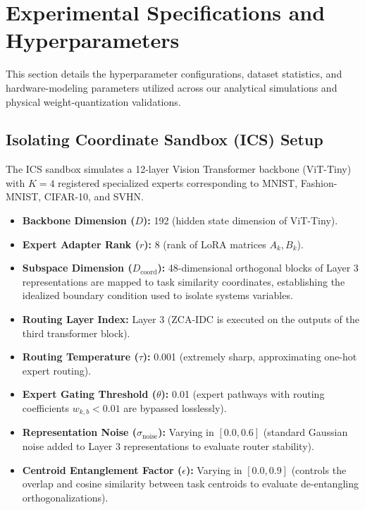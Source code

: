 \section{Experimental Specifications and Hyperparameters}
\label{sec:appendix_params}

This section details the hyperparameter configurations, dataset statistics, and hardware-modeling parameters utilized across our analytical simulations and physical weight-quantization validations.

\subsection{Isolating Coordinate Sandbox (ICS) Setup}
\label{sec:appendix_ics_params}

The ICS sandbox simulates a 12-layer Vision Transformer backbone (ViT-Tiny) with $K=4$ registered specialized experts corresponding to MNIST, Fashion-MNIST, CIFAR-10, and SVHN.
\begin{itemize}
    \item \textbf{Backbone Dimension ($D$):} 192 (hidden state dimension of ViT-Tiny).
    \item \textbf{Expert Adapter Rank ($r$):} 8 (rank of LoRA matrices $A_k, B_k$).
    \item \textbf{Subspace Dimension ($D_{\text{coord}}$):} 48-dimensional orthogonal blocks of Layer 3 representations are mapped to task similarity coordinates, establishing the idealized boundary condition used to isolate systems variables.
    \item \textbf{Routing Layer Index:} Layer 3 (ZCA-IDC is executed on the outputs of the third transformer block).
    \item \textbf{Routing Temperature ($\tau$):} 0.001 (extremely sharp, approximating one-hot expert routing).
    \item \textbf{Expert Gating Threshold ($\theta$):} 0.01 (expert pathways with routing coefficients $w_{k, b} < 0.01$ are bypassed losslessly).
    \item \textbf{Representation Noise ($\sigma_{\text{noise}}$):} Varying in $[0.0, 0.6]$ (standard Gaussian noise added to Layer 3 representations to evaluate router stability).
    \item \textbf{Centroid Entanglement Factor ($\epsilon$):} Varying in $[0.0, 0.9]$ (controls the overlap and cosine similarity between task centroids to evaluate de-entangling orthogonalizations).
\end{itemize}

